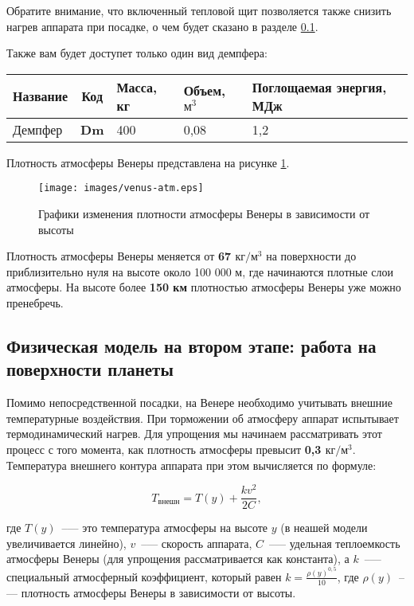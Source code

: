 \documentclass[12pt,a4paper]{article}
\begin{document}
Обратите внимание, что включенный тепловой щит позволяется также снизить нагрев аппарата при посадке,
о чем будет сказано в разделе \ref{Sec:thermal}.

Также вам будет доступет только один вид демпфера:

\begin{center}
\begin{tabular}{ |p{5.5cm}|c|p{1.5cm}|p{1.5cm}|p{4cm}| } 
  \hline
  \textbf{Название} & \textbf{Код} & \textbf{Масса, кг} & \textbf{Объем, $\text{м}^3$} &
  \textbf{Поглощаемая энергия, МДж}\\
  \hline
  Демпфер & \textbf{Dm} & 400 & 0,08 & 1,2\\
  \hline
\end{tabular}
\end{center}

Плотность атмосферы Венеры представлена на рисунке \ref{Pic:venus_atmosphere}.

\begin{figure}[tbh]
  \begin{center}
    \texttt{[image: images/venus-atm.eps]}
    \caption{Графики изменения плотности атмосферы Венеры в зависимости от высоты}
    \label{Pic:venus_atmosphere}
  \end{center}
\end{figure}

Плотность атмосферы Венеры меняется от \textbf{67 $\text{кг}/\text{м}^3$} на поверхности
до приблизительно нуля на высоте около 100 000 м, где начинаются плотные слои
атмосферы. На высоте более \textbf{150 км} плотностью атмосферы Венеры уже можно
пренебречь.

\subsection{Физическая модель на втором этапе: работа на поверхности планеты}
\label{Sec:thermal}

Помимо непосредственной посадки, на Венере необходимо учитывать внешние температурные
воздействия. При торможении об атмосферу аппарат испытывает термодинамический нагрев. Для
упрощения мы начинаем рассматривать этот процесс с того момента, как плотность атмосферы
превысит \textbf{0,3 $\text{кг}/\text{м}^3$}. Температура внешнего контура аппарата при этом
вычисляется по формуле:

$$
T_{\text{внешн}} = T(y) + \frac{k v^2}{2 C},
$$

где $T(y)$~--— это температура атмосферы на высоте $y$ (в неашей модели увеличивается
линейно), $v$~--— скорость аппарата, $C$~--— удельная теплоемкость атмосферы Венеры (для
упрощения рассматривается как константа), а $k$~--— специальный атмосферный коэффициент,
который равен $k = \frac{\rho(y)^{0,5}}{10}$, где $\rho(y)$~--— плотность атмосферы Венеры
в зависимости от высоты.
\end{document}
